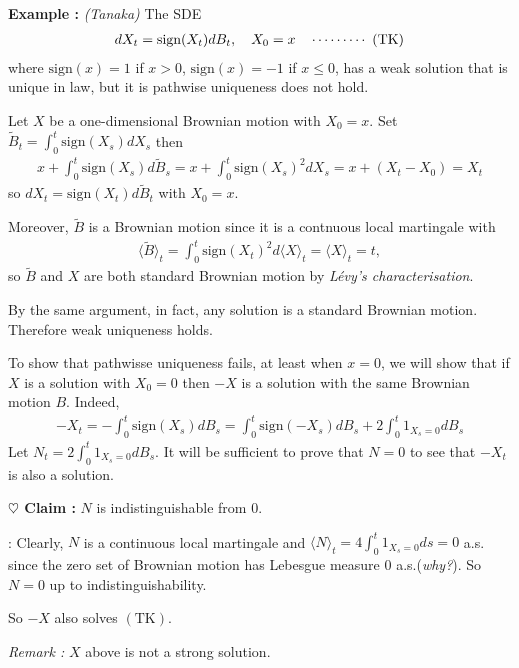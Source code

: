 \documentclass[10pt,a4paper]{article}
\newenvironment{proof}
{\begin{changemargin}{0.5cm}{0.5cm} 
	}%
	{\end{changemargin}
}
\newenvironment{subproof}
{\begin{changemargin}{0.5cm}{0.5cm} 
	}%
	{\end{changemargin}
}
\newenvironment{p}
{\begin{proof} 
	}%
	{\end{proof}
}
\begin{document}
\textbf{Example :} \emph{(Tanaka)} The SDE
\begin{align*}
dX_t = \text{sign}(X_t) dB_t, \quad X_0=x \quad \cdots\cdots\cdots\,\,(\text{TK})
\end{align*}
where $\text{sign}(x) = 1$ if $x>0$, $\text{sign}(x) =-1$ if $x\leq 0$, has a weak solution that is unique in law, but it is pathwise uniqueness does not hold. 
\begin{p}
\pf Let $X$ be a one-dimensional Brownian motion with $X_0 =x$. Set $\tilde{B}_t = \int_0^t \text{sign}(X_s) dX_s$ then
\begin{align*}
x+ \int_0^t \text{sign}(X_s) d\tilde{B}_s = x+ \int_0^t \text{sign}(X_s)^2 dX_s = x + (X_t - X_0) =X_t
\end{align*}
so $dX_t = \text{sign}(X_t) d\tilde{B}_t$ with $X_0 =x$.

\quad Moreover, $\tilde{B}$ is a Brownian motion since it is a contnuous local martingale with
\begin{align*}
\langle \tilde{B} \rangle_t = \int_0^t \text{sign}(X_t)^2 d\langle X\rangle_t  = \langle X\rangle_t =t,
\end{align*} 
so $\tilde{B}$ and $X$ are both standard Brownian motion by \emph{L\'evy's characterisation}.

\quad By the same argument, in fact, any solution is a standard Brownian motion. Therefore weak uniqueness holds.
\s

To show that pathwisse uniqueness fails, at least when $x=0$, we will show that if $X$ is a solution with $X_0 =0$ then $-X$ is a solution with the same Brownian motion $B$. Indeed,
\begin{align*}
-X_t = -\int_0^t \text{sign}(X_s) dB_s = \int_0^t \text{sign}(-X_s) dB_s + 2\int_0^t 1_{X_s =0} dB_s
\end{align*}
Let $N_t = 2\int_0^t 1_{X_s =0} dB_s$. It will be sufficient to prove that $N =0$ to see that $-X_t$ is also a solution.

\textbf{$\heartsuit$ Claim :} $N$ is indistinguishable from 0.
\begin{subproof}
: Clearly, $N$ is a continuous local martingale and $\langle N \rangle_t = 4\int_0^t 1_{X_s =0} ds=0$ a.s. since the zero set of Brownian motion has Lebesgue measure 0 a.s.(\emph{why?}). So $N=0$ up to indistinguishability.
\end{subproof}
So $-X$ also solves $(\text{TK})$.

\eop
\end{p}
\s

\emph{Remark :} $X$ above is not a strong solution.
\s
\end{document}
